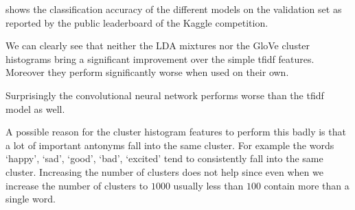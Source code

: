  shows the classification accuracy of the different models on the
validation set as reported by the public leaderboard of the Kaggle competition.

We can clearly see that neither the LDA mixtures nor the GloVe cluster histograms
bring a significant improvement over the simple tfidf features. Moreover they
perform significantly worse when used on their own.

Surprisingly the convolutional neural network performs worse than the tfidf model
as well.

A possible reason for the cluster histogram features to perform this badly is that
a lot of important antonyms fall into the same cluster. For example the words
`happy', `sad', `good', `bad', `excited' tend to consistently fall into the
same cluster. Increasing the number of clusters does not help since even when
we increase the number of clusters to $1000$ usually less than $100$ contain
more than a single word.
